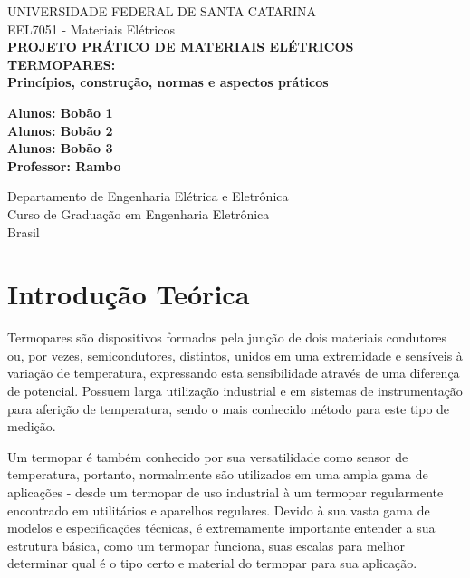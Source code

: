 \documentclass[a4paper,12pt]{report}
\begin{document}
	
	\begin{titlepage}
		\begin{center}
			
			\Large
			UNIVERSIDADE FEDERAL DE SANTA CATARINA\\
			EEL7051 - Materiais Elétricos\\
			\vspace*{5cm}
			\Huge
			\textbf{PROJETO PRÁTICO DE MATERIAIS ELÉTRICOS}\\
			\textbf{TERMOPARES:}\\
			\textbf{Princípios, construção, normas e aspectos práticos}
			
			\vspace{1.5cm}
			
			\vfill
			\Large
			\textbf{Alunos: Bobão 1}\\
			\textbf{Alunos: Bobão 2}\\
			\textbf{Alunos: Bobão 3}\\
			
			\textbf{Professor: Rambo} %
			\vspace{0.8cm}
			
			Departamento de Engenharia Elétrica e Eletrônica\\
			Curso de Graduação em Engenharia Eletrônica\\
			Brasil\\
			
			
			
		\end{center}
	\end{titlepage}
	\Large
	
	\pagebreak
	\listoffigures
    \pagebreak
    \tableofcontents
	
	\chapter{Introdução Teórica}
	
	Termopares são dispositivos formados pela junção de dois materiais condutores ou, por vezes, semicondutores, distintos, unidos em uma extremidade e sensíveis à variação de temperatura, expressando esta sensibilidade através de uma diferença de potencial. Possuem larga utilização industrial e em sistemas de instrumentação para aferição de temperatura, sendo o mais conhecido método para este tipo de medição.
	
	\noindent Um termopar é também conhecido por sua versatilidade como sensor de temperatura, portanto, normalmente são utilizados em uma ampla gama de aplicações - desde um termopar de uso industrial à um termopar regularmente encontrado em utilitários e aparelhos regulares. Devido à sua vasta gama de modelos e especificações técnicas, é extremamente importante entender a sua estrutura básica, como um termopar funciona, suas escalas para melhor determinar qual é o tipo certo e material do termopar para sua aplicação.
	
\end{document}
